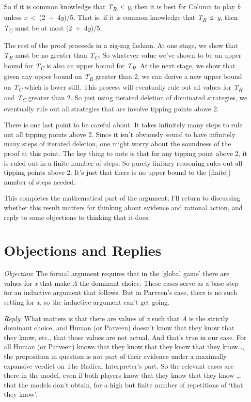 \documentclass[
  10pt,
  letterpaper,
  twoside]{scrbook}
\begin{document}
So if it is common knowledge that \emph{T\textsubscript{R}}~≤~\emph{y},
then it is best for Column to play \emph{b} unless
\emph{x}~\textless~(2~+~4\emph{y})/5. That is, if it is common knowledge
that \emph{T\textsubscript{R}}~≤~\emph{y}, then
\emph{T\textsubscript{C}} must be at most (2~+~4\emph{y})/5.

The rest of the proof proceeds in a zig-zag fashion. At one stage, we
show that \emph{T\textsubscript{R}} must be no greater than
\emph{T\textsubscript{C}}. So whatever value we've shown to be an upper
bound for \emph{T\textsubscript{C}} is also an upper bound for
\emph{T\textsubscript{R}}. At the next stage, we show that given any
upper bound on \emph{T\textsubscript{R}} greater than 2, we can derive a
new upper bound on \emph{T\textsubscript{C}} which is lower still. This
process will eventually rule out all values for
\emph{T\textsubscript{R}} and \emph{T\textsubscript{C}} greater than 2.
So just using iterated deletion of dominated strategies, we eventually
rule out all strategies that are involve tipping points above 2.

There is one last point to be careful about. It takes infinitely many
steps to rule out all tipping points above 2. Since it isn't obviously
sound to have infinitely many steps of iterated deletion, one might
worry about the soundness of the proof at this point. The key thing to
note is that for any tipping point above 2, it is ruled out in a finite
number of steps. So purely finitary reasoning rules out all tipping
points above 2. It's just that there is no upper bound to the (finite!)
number of steps needed.

This completes the mathematical part of the argument; I'll return to
discussing whether this result matters for thinking about evidence and
rational action, and reply to some objections to thinking that it does.

\section{Objections and Replies}\label{sec-evsolution}

\emph{Objection}: The formal argument requires that in the `global game'
there are values for \emph{x} that make \emph{A} the dominant choice.
These cases serve as a base step for an inductive argument that follows.
But in Parveen's case, there is no such setting for \emph{x}, so the
inductive argument can't get going.

\emph{Reply}: What matters is that there are values of \emph{x} such
that \emph{A} is the strictly dominant choice, and Human (or Parveen)
doesn't know that they know that they know, etc., that those values are
not actual. And that's true in our case. For all Human (or Parveen)
knows that they know that they know that they know\ldots, the
proposition in question is not part of their evidence under a maximally
expansive verdict on The Radical Interpreter's part. So the relevant
cases are there in the model, even if both players know that they know
that they know \ldots{} that the models don't obtain, for a high but
finite number of repetitions of `that they know'.
\end{document}
